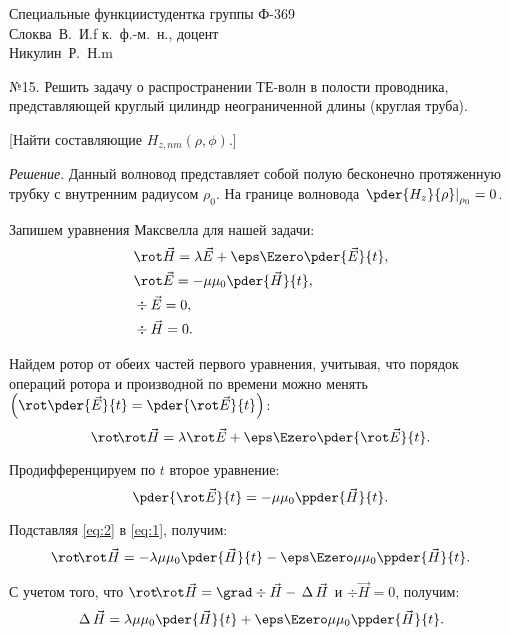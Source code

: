





\renewcommand{\L}{\,\Delta\,}


{Специальные функции}{}{}{студентка группы Ф-369\\Слоква~В.~И.}{f}
{к.~ф.-м.~н., доцент\\Никулин~Р.~Н.}{m}

№15. Решить задачу о распространении ТЕ-волн в полости проводника,
представляющей круглый цилиндр неограниченной длины (круглая труба).
    
[Найти составляющие \( H_{z, nm}(\rho, \phi)\).]

\vspace*{2em}
\emph{Решение}. Данный волновод представляет собой полую бесконечно
протяженную трубку с внутренним радиусом \( \rho_0 \).
На границе волновода \( \left.\pder{H_z}{\rho}\right|_{\rho_0} = 0 \).

Запишем уравнения Максвелла для нашей задачи:
\begin{align*}
    & \rot\vec{H} = \lambda\vec{E} + \eps\Ezero\pder{\vec{E}}{t}, \\
    & \rot\vec{E} = -\mu\mu_0\pder{\vec{H}}{t}, \\
    & \div\vec{E} = 0, \\
    & \div\vec{H} = 0.
\end{align*}

Найдем ротор от обеих частей первого уравнения, учитывая, что порядок операций
ротора и производной по времени можно менять
\( \left(\rot\pder{\vec{E}}{t}= \pder{\rot\vec{E}}{t}\right) \):
\begin{equation}
    \rot\!\rot\vec{H} = \lambda\rot\vec{E} + \eps\Ezero\pder{\rot\vec{E}}{t}.
    \label{eq:1}
\end{equation}

Продифференцируем по \( t \) второе уравнение:
\begin{equation}
    \pder{\rot\vec{E}}{t} = -\mu\mu_0\ppder{\vec{H}}{t}.
    \label{eq:2}
\end{equation}

Подставляя \eqref{eq:2} в \eqref{eq:1}, получим:
\[
    \rot\!\rot\vec{H} = -\lambda\mu\mu_0\pder{\vec{H}}{t} - \eps\Ezero\mu\mu_0
    \ppder{\vec{H}}{t}.
\]

С учетом того, что \( \rot\!\rot\vec{H} = \grad\div\vec{H} - \L\vec{H} \) и
\( \div\vec{H} = 0 \), получим:
\begin{equation}
    \L\vec{H} = \lambda\mu\mu_0\pder{\vec{H}}{t} + \eps\Ezero\mu\mu_0
    \ppder{\vec{H}}{t}.
    \label{eq:4}
\end{equation}

